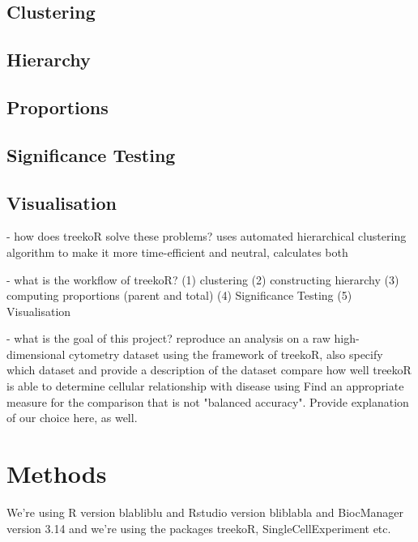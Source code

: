 \documentclass[11pt,a4paper,twoside]{report}\usepackage[]{graphicx}\usepackage[]{color}
\begin{document}
\section{Clustering}

\section{Hierarchy}

\section{Proportions}

\section{Significance Testing}

\section{Visualisation}

- how does treekoR solve these problems?
uses automated hierarchical clustering algorithm to make it more time-efficient and neutral, calculates both %

- what is the workflow of treekoR?
(1) clustering
(2) constructing hierarchy
(3) computing proportions (parent and total)
(4) Significance Testing
(5) Visualisation

- what is the goal of this project?
reproduce an analysis on a raw high-dimensional cytometry dataset using the framework of treekoR, also specify which dataset and provide a description of the dataset
compare how well treekoR is able to determine cellular relationship with disease using %
Find an appropriate measure for the comparison that is not "balanced accuracy".
Provide explanation of our choice here, as well.




\chapter{Methods} 

We're using R version blabliblu and Rstudio version bliblabla and BiocManager version 3.14 and we're using the packages treekoR, SingleCellExperiment etc.
\end{document}

